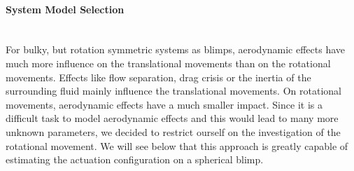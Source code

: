 \paragraph{System Model Selection} ~\\
For bulky, but rotation symmetric systems as blimps, aerodynamic effects have much more influence on the translational movements than on the rotational movements.
Effects like flow separation, drag crisis or the inertia of the surrounding fluid mainly influence the translational movements.
On rotational movements, aerodynamic effects have a much smaller impact.
Since it is a difficult task to model aerodynamic effects and this would lead to many more unknown parameters, we decided to restrict ourself on the investigation of the rotational movement.
We will see below that this approach is greatly capable of estimating the actuation configuration on a spherical blimp.

